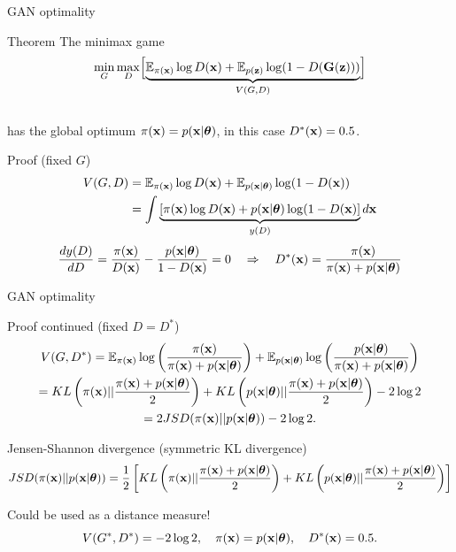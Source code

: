 \begin{frame}{GAN optimality}
	\begin{block}{Theorem}
		The minimax game 
		\vspace{-0.3cm}
		\[
			\min_{G} \max_D \Bigl[ \underbrace{\mathbb{E}_{\pi(\mathbf{x})} \log D(\mathbf{x}) + \mathbb{E}_{p(\mathbf{z})} \log (1 - D(\mathbf{G}(\mathbf{z})))}_{V(G, D)} \Bigr]
		\]
		\vspace{-0.5cm} \\
		has the global optimum $\pi(\mathbf{x}) = p(\mathbf{x} | \boldsymbol{\theta})$, in this case $D^*(\mathbf{x}) = 0.5$.
	\end{block}
	\begin{block}{Proof (fixed $G$)}
		\vspace{-0.5cm}
		\begin{align*}
			V(G, D) &= \mathbb{E}_{\pi(\mathbf{x})} \log D(\mathbf{x}) + \mathbb{E}_{p(\mathbf{x} | \boldsymbol{\theta})} \log (1 - D(\mathbf{x})) \\
			&= \int \underbrace{\left[ \pi(\mathbf{x}) \log D(\mathbf{x}) + p(\mathbf{x} | \boldsymbol{\theta})\log (1 - D(\mathbf{x}) \right]}_{y(D)} d \mathbf{x}
		\end{align*}
		\vspace{-0.2cm}
		\[
			\frac{d y(D)}{d D} = \frac{\pi(\mathbf{x})}{D(\mathbf{x})} - \frac{p(\mathbf{x} | \boldsymbol{\theta})}{1 - D(\mathbf{x})} = 0 \quad \Rightarrow \quad D^*(\mathbf{x}) = \frac{\pi(\mathbf{x})}{\pi(\mathbf{x}) + p(\mathbf{x} | \boldsymbol{\theta})}
		\]
	\end{block}
\end{frame}
\begin{frame}{GAN optimality}
	\begin{block}{Proof continued (fixed $D = D^*$)}
		\vspace{-0.5cm}
		\begin{multline*}
			V(G, D^*) = \mathbb{E}_{\pi(\mathbf{x})} \log \left( \frac{\pi(\mathbf{x})}{\pi(\mathbf{x}) + p(\mathbf{x} | \boldsymbol{\theta})} \right) + \mathbb{E}_{p(\mathbf{x} | \boldsymbol{\theta})} \log \left( \frac{p(\mathbf{x} | \boldsymbol{\theta})}{\pi(\mathbf{x}) + p(\mathbf{x} | \boldsymbol{\theta})}\right)  \\
		 = KL \left(\pi(\mathbf{x}) || \frac{\pi(\mathbf{x}) + p(\mathbf{x} | \boldsymbol{\theta})}{2}\right) + KL \left(p(\mathbf{x} | \boldsymbol{\theta}) || \frac{\pi(\mathbf{x}) + p(\mathbf{x} | \boldsymbol{\theta})}{2}\right) - 2\log 2 \\
		 = 2JSD(\pi(\mathbf{x}) || p(\mathbf{x} | \boldsymbol{\theta})) - 2\log 2.
		\end{multline*}
	\end{block}
	\vspace{-0.3cm}
	\begin{block}{Jensen-Shannon divergence (symmetric KL divergence)}
		\vspace{-0.2cm}
		\footnotesize
		\[
			JSD(\pi(\mathbf{x}) || p(\mathbf{x} | \boldsymbol{\theta})) = \frac{1}{2} \left[KL \left(\pi(\mathbf{x}) || \frac{\pi(\mathbf{x}) + p(\mathbf{x} | \boldsymbol{\theta})}{2}\right) + KL \left(p(\mathbf{x} | \boldsymbol{\theta}) || \frac{\pi(\mathbf{x}) + p(\mathbf{x} | \boldsymbol{\theta})}{2}\right) \right]
		\]
	\end{block}
	Could be used as a distance measure!
	\[
		V(G^*, D^*) = -2\log 2, \quad \pi(\mathbf{x}) = p(\mathbf{x} | \boldsymbol{\theta}), \quad  D^*(\mathbf{x}) = 0.5.
	\]
	
\end{frame}
